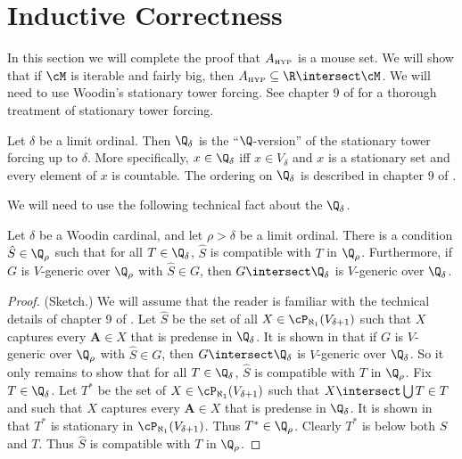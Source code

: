
\skipbig

\section{Inductive Correctness}

\label{section:correctness}

In this section we will complete the proof that $A_{\mbox{\tiny HYP}}$ is a mouse
set. We will show that if $\cM$ is iterable and fairly big,
then $\Ahyp\subseteq\R\intersect\cM$.
We will need to use Woodin's stationary tower forcing. See chapter 9  of
\cite{Martin_Book} for a thorough treatment of stationary tower forcing.

\begin{definition}
Let $\delta$ be a limit ordinal. Then $\Q_{\delta}$ is the
``$\Q$-version''  of the stationary
tower forcing up to $\delta$.  More specifically, $x\in\Q_{\delta}$ iff
$x\in V_{\delta}$ and  $x$ is a stationary set and every element of $x$
is countable. The ordering on $\Q_{\delta}$ is  described in chapter 9
of \cite{Martin_Book}.
\end{definition}

We will need to use the following technical fact about the
$\Q_{\delta}$.

\begin{lemma}[Woodin]
\label{TechFact}
Let $\delta$ be a Woodin cardinal, and let $\rho>\delta$ be a
limit ordinal. There is a condition $\hat{S}\in\Q_{\rho}$ such that
for all $T\in\Q_{\delta}$, $\hat{S}$ is compatible with $T$ in
$\Q_{\rho}$. Furthermore, if $G$ is $V$-generic over $\Q_{\rho}$ with
$\hat{S}\in G$, then $G\intersect\Q_{\delta}$ is $V$-generic
over $\Q_{\delta}$.
\end{lemma}
\begin{proof}
(Sketch.) We will assume that the reader is familiar with the technical
details of chapter 9 of \cite{Martin_Book}. Let $\hat{S}$ be the set of all
$X\in\cP_{\aleph_1}(V_{\delta+1})$ such that $X$ captures every
$\mathbf{A}\in X$ that is predense in $\Q_{\delta}$. It is shown in
\cite{Martin_Book} that if $G$ is $V$-generic over $\Q_{\rho}$ with
$\hat{S}\in G$, then $G\intersect\Q_{\delta}$ is $V$-generic
over $\Q_{\delta}$. So it only remains to show that for all
$T\in\Q_{\delta}$, $\hat{S}$ is compatible with $T$ in
$\Q_{\rho}$.  Fix $T\in\Q_{\delta}$. Let $T^*$ be the set of
$X\in\cP_{\aleph_1}(V_{\delta+1})$ such that $X\intersect\bigcup T\in T$
and such that $X$ captures every $\mathbf{A}\in X$ that is predense in
$\Q_{\delta}$. It is shown in \cite{Martin_Book} that $T^*$ is stationary
in $\cP_{\aleph_1}(V_{\delta+1})$. Thus $T^*\in\Q_{\rho}$.
Clearly $T^*$ is below both $\hat{S}$
and $T$. Thus $\hat{S}$ is compatible with $T$ in
$\Q_{\rho}$.
\end{proof}

